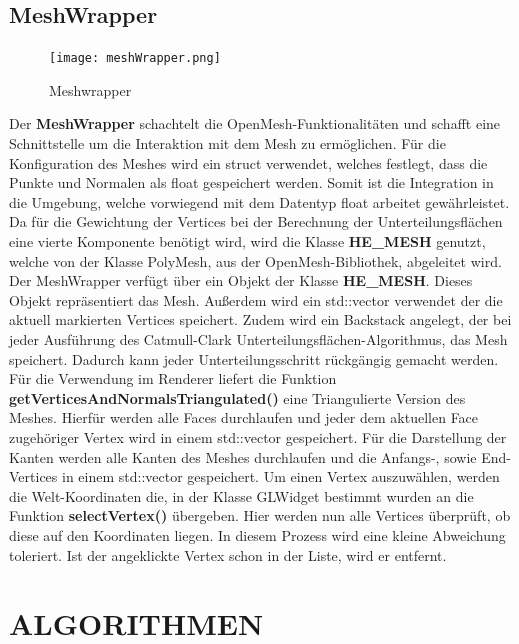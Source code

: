\subsection{MeshWrapper}

	\begin{figure}[H]
	\centering
	\texttt{[image: meshWrapper.png]}
	\caption{Meshwrapper}
	\label{fig8}
	\end{figure}

\noindent Der \textbf{MeshWrapper} schachtelt die OpenMesh-Funktionalitäten und schafft eine Schnittstelle um die Interaktion mit dem Mesh zu ermöglichen. Für die Konfiguration des Meshes wird ein struct verwendet, welches festlegt, dass die Punkte und Normalen als float gespeichert werden. Somit ist die Integration in die Umgebung, welche vorwiegend mit dem Datentyp float arbeitet gewährleistet. Da für die Gewichtung der Vertices bei der Berechnung der Unterteilungsflächen eine vierte Komponente benötigt wird, wird die Klasse \textbf{HE\_MESH} genutzt, welche von der Klasse PolyMesh, aus der OpenMesh-Bibliothek, abgeleitet wird.\newline
Der MeshWrapper verfügt über ein Objekt der Klasse \textbf{HE\_MESH}. Dieses Objekt repräsentiert das Mesh. Außerdem wird ein std::vector verwendet der die aktuell markierten Vertices speichert. Zudem wird ein Backstack angelegt, der bei jeder Ausführung des Catmull-Clark Unterteilungsflächen-Algorithmus, das Mesh speichert. Dadurch kann jeder Unterteilungsschritt rückgängig gemacht werden.\newline
Für die Verwendung im Renderer liefert die Funktion \textbf{getVerticesAndNormalsTriangulated()} eine Triangulierte Version des Meshes. Hierfür werden alle Faces durchlaufen und jeder dem aktuellen Face zugehöriger Vertex wird in einem std::vector gespeichert.\newline
Für die Darstellung der Kanten werden alle Kanten des Meshes durchlaufen und die Anfangs-, sowie End-Vertices in einem std::vector gespeichert.\newline
Um einen Vertex auszuwählen, werden die Welt-Koordinaten die, in der Klasse GLWidget bestimmt wurden an die Funktion \textbf{selectVertex()} übergeben. Hier werden nun alle Vertices überprüft, ob diese auf den Koordinaten liegen. In diesem Prozess wird eine kleine Abweichung toleriert. Ist der angeklickte Vertex schon in der Liste, wird er entfernt.
		
	\newpage
	\section{\Large ALGORITHMEN}
	
